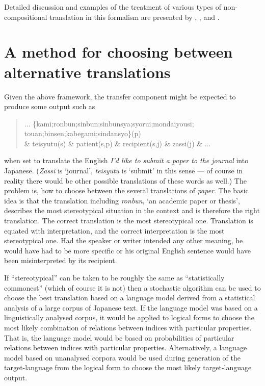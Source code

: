 Detailed discussion and examples of the treatment of various types of
non-compositional translation in this formalism are presented by
\cite{phillips:93:c}, \cite{antona:93:a}, and \cite{phillips:93:b}.


\section{A method for choosing between alternative translations}

Given the above framework, the transfer component might be expected to
produce some output such as
\begin{quote}
  \smallskip
  \small
  $\ldots$ \{kami;ronbun;sinbun;sinbunsya;syorui;mondaiyousi;
  touan;binsen;kabegami;sindansyo\}(p)\\
  \& teisyutu(s) \&
  patient(s,p) \& recipient(s,j) \& zassi(j) \& $\ldots$
\end{quote}
when set to translate the English {\it I'd like to submit a paper to the
journal\/} into Japanese. ({\it Zassi\/} is `journal',
{\it teisyutu\/}
is `submit' in this sense --- of course in reality there would be other
possible translations of these words as well.) The problem is, how
to choose between the several translations of
{\it paper}.
The basic idea is that the translation including
{\it ronbun},
`an academic paper or thesis', describes the most stereotypical situation
in the context and is therefore the right translation. The correct
translation is the most stereotypical one.
Translation is equated with interpretation, and the correct
interpretation is the most stereotypical one.
Had the speaker or writer intended any other meaning, he would have had
to be more specific or his original English sentence would have been
misinterpreted by its recipient.

If ``stereotypical'' can be taken to be roughly the same as
``statistically commonest'' (which of course it is not) then a
stochastic algorithm can be used to choose the best translation based on
a language model derived from a statistical analysis of a large corpus
of Japanese text.
If the language model was based on a linguistically analysed corpus, it
would be applied to logical forms to choose the most likely combination
of relations between indices with particular properties.
That is, the language model would be based on probabilities of
particular relations between indices with particular properties.
Alternatively, a language model based on unanalysed corpora would be
used during generation of the target-language from the logical form to
choose the most likely target-language output.

